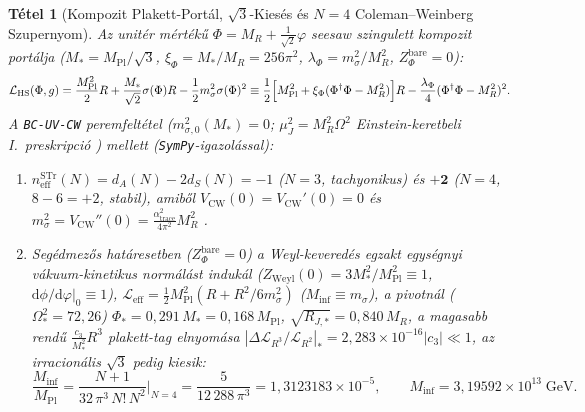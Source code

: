 \documentclass[11pt,a4paper]{article}
\newtheorem{theorem}{Tétel}[section]
\begin{document}
\begin{theorem}[Kompozit Plakett-Portál, \texorpdfstring{$\sqrt{3}$}{sqrt(3)}-Kiesés és \texorpdfstring{$N = 4$}{N = 4} Coleman--Weinberg Szupernyom]
\label{thm:scalaron}
Az unitér mértékű $\Phi = M_R + \frac{1}{\sqrt{2}}\varphi$ seesaw szingulett kompozit portálja ($M_* = M_{\mathrm{Pl}}/\sqrt{3}$, $\xi_\Phi = M_*/M_R = 256\pi^2$, $\lambda_\Phi = m_\sigma^2/M_R^2$, $Z_\Phi^{\mathrm{bare}} = 0$):
\begin{equation}
\mathcal{L}_{\mathrm{HS}}(\Phi, g) = \frac{M_{\mathrm{Pl}}^2}{2}R + \frac{M_*}{\sqrt{2}}\sigma(\Phi)R - \frac{1}{2}m_\sigma^2\sigma(\Phi)^2 \equiv \frac{1}{2}\Bigl[M_{\mathrm{Pl}}^2 + \xi_\Phi(\Phi^\dagger\Phi - M_R^2)\Bigr]R - \frac{\lambda_\Phi}{4}(\Phi^\dagger\Phi - M_R^2)^2.
\end{equation}
A \texttt{BC-UV-CW} peremfeltétel ($m_{\sigma,0}^2(M_*)=0$; $\mu_J^2 = M_R^2\Omega^2$ Einstein-keretbeli I.\ preskripció \cite{ShaposhnikovZenhausern2009}) mellett (\texttt{SymPy}-igazolással):
\begin{enumerate}[label=(\alph*),leftmargin=1.8em,itemsep=2pt]
\item $n_{\mathrm{eff}}^{\mathrm{STr}}(N) = d_A(N) - 2d_S(N) = -1$ ($N=3$, tachyonikus) és $\mathbf{+2}$ ($N=4$, $8-6=+2$, stabil), amiből $V_{\mathrm{CW}}(0) = V_{\mathrm{CW}}'(0) = 0$ és $m_\sigma^2 = V_{\mathrm{CW}}''(0) = \frac{\alpha_{\mathrm{trace}}^2}{4\pi^2}M_R^2$ \cite{ColemanWeinberg1973,GildenerWeinberg1976}.
\item Segédmezős határesetben ($Z_\Phi^{\mathrm{bare}} = 0$) a Weyl-keveredés egzakt egységnyi vákuum-kinetikus normálást indukál ($Z_{\mathrm{Weyl}}(0) = 3M_*^2/M_{\mathrm{Pl}}^2 \equiv 1$, $\mathrm{d}\phi/\mathrm{d}\varphi|_0 \equiv 1$), $\mathcal{L}_{\mathrm{eff}} = \frac{1}{2}M_{\mathrm{Pl}}^2(R + R^2/6m_\sigma^2)$ ($M_{\mathrm{inf}} \equiv m_\sigma$), a pivotnál ($\Omega_*^2 = 72{,}26$) $\Phi_* = 0{,}291\,M_* = 0{,}168\,M_{\mathrm{Pl}}$, $\sqrt{R_{J,*}} = 0{,}840\,M_R$, a magasabb rendű $\frac{c_3}{M_*^2}R^3$ plakett-tag elnyomása $|\Delta\mathcal{L}_{R^3}/\mathcal{L}_{R^2}|_* = 2{,}283\times 10^{-16}|c_3| \ll 1$, az irracionális $\sqrt{3}$ pedig kiesik:
\begin{equation}
\boxed{\frac{M_{\mathrm{inf}}}{M_{\mathrm{Pl}}} = \frac{N + 1}{32\,\pi^3\,N!\,N^2}\Bigg|_{N=4} = \frac{5}{12\,288\,\pi^3} = 1{,}3123183\times 10^{-5}, \qquad M_{\mathrm{inf}} = 3{,}19592\times 10^{13}\;\mathrm{GeV}.}
\end{equation}
\end{enumerate}
\end{theorem}
\end{document}
